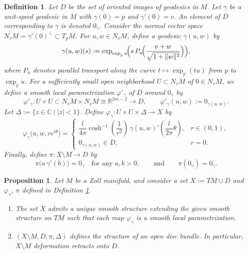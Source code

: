 \documentclass[10pt,a4paper]{amsart}
\newtheorem{defn}{Definition}
\newtheorem{prop}{Proposition}
\newcommand{\bC}{\mathbb{C}}
\newcommand{\bR}{\mathbb{R}}
\begin{document}
\begin{defn}\label{chart}
Let $D$ be the set of oriented images of geodesics in $M$. Let $\gamma$ be a unit-speed geodesic in $M$ with $\gamma(0)=p$ and $\gamma'(0)=v$. An element of $D$ corresponding to $\gamma$ is denoted $0_\gamma$.
Consider the normal vector space $N_vM=\gamma'(0)^\perp \subset T_pM$.
For $u,w\in N_v M$, define a geodesic $\gamma(u,w)$ by
\[
\gamma(u,w)(s):=\exp_{\exp_p u}\!\Bigl( s\, P_u\!\Bigl(\frac{v+w}{\sqrt{1+\|w\|^2}}\Bigr)\Bigr),
\]
where $P_u$ denotes parallel transport along the curve $t\mapsto \exp_p(tu)$ from $p$ to $\exp_p u$. For a sufficiently small open neighborhood $U\subset N_v M$ of $0\in N_v M$, we define a smooth local parametrization $\varphi'_\gamma$ of $D$ around $0_\gamma$ by
\[
\varphi'_\gamma \colon U\times U \subset N_vM\times N_vM \cong \bR^{2m-2} \longrightarrow D,
\qquad
\varphi'_\gamma(u,w):=0_{\gamma(u,w)}.
\]
Let $\Delta:=\{z\in \bC \mid |z|<1\}$. Define $\varphi_\gamma \colon U\times U\times \Delta \longrightarrow X$ by
\[
\varphi_\gamma\!\bigl(u,w,re^{i\theta}\bigr)=
\begin{cases}
\dfrac{l}{4\pi}\cosh^{-1}\left(\dfrac{1}{r^2}\right)\,\gamma(u,w)'\!\left(\dfrac{l}{2\pi}\theta\right), & r\in (0,1),\\[0.4em]
0_{\gamma(u,w)}\in D, & r=0.
\end{cases}
\]
Finally, define $\pi \colon X\setminus M \to D$ by
\[
\pi\bigl(a\,\gamma'(b)\bigr)=0_\gamma \quad \text{for any } a,b>0,
\qquad\text{and}\qquad
\pi(0_\gamma)=0_\gamma.
\]
\end{defn}

\begin{prop}\label{bundle}
Let $M$ be a Zoll manifold, and consider a set $X := TM \cup D$ and $\varphi_\gamma$, $\pi$ defined in Definition \ref{chart}.
\begin{enumerate}
\item The set $X$ admits a unique smooth structure extending the given smooth structure on $TM$ such that each map $\varphi_\gamma$ is a smooth local parametrization.
\item $(X\setminus M, D, \pi, \Delta)$ defines the structure of an open disc bundle. In particular, $X\setminus M$ deformation retracts onto $D$.
\end{enumerate}
\end{prop}
\end{document}
